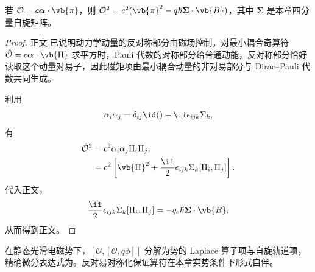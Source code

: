 \begin{lemma}
若 $\mathcal O=c\boldsymbol\alpha\cdot\vb{\pi}$，则 $\mathcal O^2=c^2(\vb{\pi}^2-q\hbar\boldsymbol\Sigma\cdot\vb{B})$，其中 $\boldsymbol\Sigma$ 是本章四分量自旋矩阵。
\end{lemma}

\begin{proof}
正文 已说明动力学动量的反对称部分由磁场控制。对最小耦合奇算符 $\hat{\mathcal O}=c\boldsymbol\alpha\cdot\vb{\Pi}$ 求平方时，Pauli 代数的对称部分给普通动能，反对称部分恰好读取这个动量对易子，因此磁矩项由最小耦合动量的非对易部分与 Dirac--Pauli 代数共同生成。

利用
\begin{equation*}
 \alpha_i\alpha_j
 =\delta_{ij}\id()+\ii\epsilon_{ijk}\Sigma_k,
\end{equation*}
有
\begin{align*}
 \hat{\mathcal O}^2
 &=c^2\alpha_i\alpha_j\Pi_i\Pi_j,\\
 &=c^2\left[
 \vb{\Pi}^2
 +\frac{\ii}{2}\epsilon_{ijk}\Sigma_k[\Pi_i,\Pi_j]
 \right].
\end{align*}
代入正文，
\begin{equation*}
 \frac{\ii}{2}\epsilon_{ijk}\Sigma_k[\Pi_i,\Pi_j]
 =-q_{\mathrm e}\hbar\boldsymbol\Sigma\cdot\vb{B},
\end{equation*}
从而得到正文。
\end{proof}

\begin{lemma}[静电势的双重交换子]
在静态光滑电磁势下，$[\mathcal O,[\mathcal O,q\phi]]$ 分解为势的 Laplace 算子项与自旋轨道项，精确微分表达式为。反对易对称化保证算符在本章实势条件下形式自伴。
\end{lemma}


